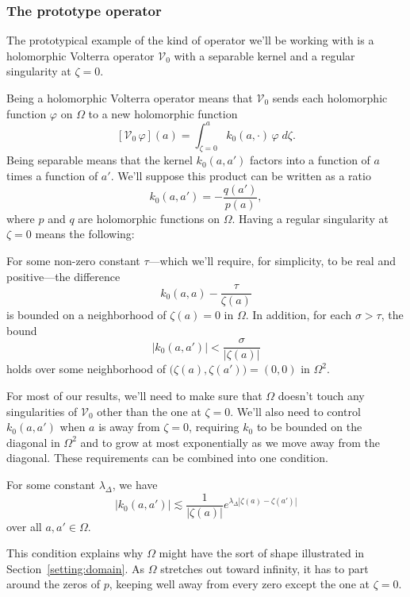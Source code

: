 \documentclass{article}
\makeatletter
\theoremstyle{plain}
\newcommand{\condconst}[2]{\item[($\text{\textsc{#1}} \mid #2$)]\protected@edef\@currentlabel{$\text{\textsc{#1}} \mid #2$}}
\newcommand{\hardpart}{\mathcal{V}_0}
\newcommand{\hardker}{k_0}
\newcommand{\domain}{\Omega}
\makeatother
\begin{document}
\subsubsection{The prototype operator}\label{setting:basic}
The prototypical example of the kind of operator we'll be working with is a holomorphic Volterra operator $\hardpart$ with a separable kernel and a regular singularity at $\zeta = 0$.

Being a holomorphic Volterra operator means that $\hardpart$ sends each holomorphic function $\varphi$ on $\domain$ to a new holomorphic function
\[ [\hardpart\,\varphi](a) = \int_{\zeta = 0}^a \hardker(a, \cdot)\,\varphi\;d\zeta. \]
Being separable means that the kernel $\hardker(a, a')$ factors into a function of $a$ times a function of $a'$. We'll suppose this product can be written as a ratio
\[ \hardker(a, a') = - \frac{q(a')}{p(a)}, \]
where $p$ and $q$ are holomorphic functions on $\domain$. Having a regular singularity at $\zeta = 0$ means the following:
\begin{conditions}
\condconst{sing}{\tau}\label{cond:sing} For some non-zero constant $\tau$---which we'll require, for simplicity, to be real and positive---the difference
\[ \hardker(a, a) - \frac{\tau}{\zeta(a)} \]
is bounded on a neighborhood of $\zeta(a) = 0$ in $\domain$.
In addition, for each $\sigma > \tau$, the bound
\[ |\hardker(a, a')| < \frac{\sigma}{|\zeta(a)|} \]
holds over some neighborhood of $\big(\zeta(a), \zeta(a')\big) = (0, 0)$ in $\domain^2$. 
\end{conditions}
For most of our results, we'll need to make sure that $\domain$ doesn't touch any singularities of $\hardpart$ other than the one at $\zeta = 0$. We'll also need to control $\hardker(a, a')$ when $a$ is away from $\zeta = 0$, requiring $\hardker$ to be bounded on the diagonal in $\domain^2$ and to grow at most exponentially as we move away from the diagonal. These requirements can be combined into one condition.
\begin{conditions}
\condconst{diag$_0$}{\lambda_\Delta}\label{cond:diag-basic} For some constant $\lambda_\Delta$, we have
\[ |\hardker(a, a')| \lesssim \frac{1}{|\zeta(a)|} e^{\lambda_\Delta|\zeta(a)-\zeta(a')|} \]
over all $a, a' \in \domain$.
\end{conditions}
This condition explains why $\domain$ might have the sort of shape illustrated in Section~\ref{setting:domain}. As $\domain$ stretches out toward infinity, it has to part around the zeros of $p$, keeping well away from every zero except the one at $\zeta = 0$. 
\end{document}
